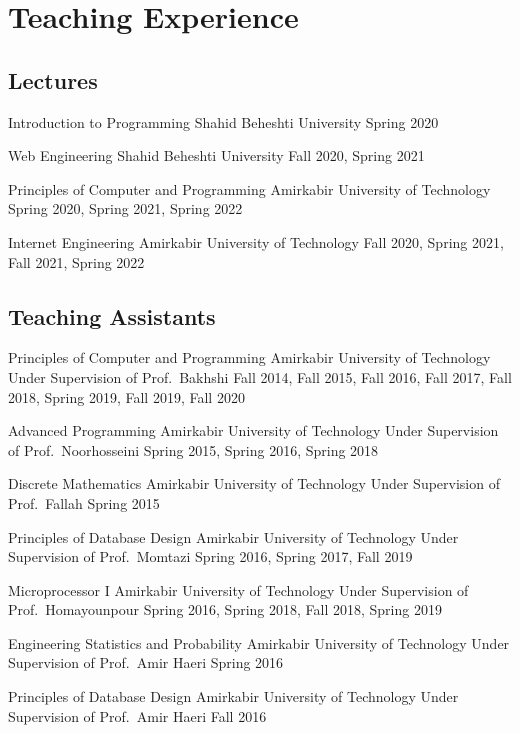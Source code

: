 \section{Teaching Experience}

\subsection{Lectures}
\cventry{}
  {Introduction to Programming}
  {}
  {Shahid Beheshti University}
  {}
  {Spring 2020}

\cventry{}
  {Web Engineering}
  {}
  {Shahid Beheshti University}
  {}
  {Fall 2020, Spring 2021}

\cventry{}
  {Principles of Computer and Programming}
  {}
  {Amirkabir University of Technology}
  {}
  {Spring 2020, Spring 2021, Spring 2022}

\cventry{}
  {Internet Engineering}
  {}
  {Amirkabir University of Technology}
  {}
  {Fall 2020, Spring 2021, Fall 2021, Spring 2022}

\subsection{Teaching Assistants}

\cventry{}
  {Principles of Computer and Programming}
  {}
  {Amirkabir University of Technology}
  {Under Supervision of Prof.\ Bakhshi}
  {Fall 2014, Fall 2015, Fall 2016, Fall 2017, Fall 2018, Spring 2019, Fall 2019, Fall 2020}

\cventry{}
  {Advanced Programming}
  {}
  {Amirkabir University of Technology}
  {Under Supervision of Prof.\ Noorhosseini}
  {Spring 2015, Spring 2016, Spring 2018}

\cventry{}
  {Discrete Mathematics}
  {}
  {Amirkabir University of Technology}
  {Under Supervision of Prof.\ Fallah}
  {Spring 2015}

\cventry{}
  {Principles of Database Design}
  {}
  {Amirkabir University of Technology}
  {Under Supervision of Prof.\ Momtazi}
  {Spring 2016, Spring 2017, Fall 2019}

\cventry{}
  {Microprocessor I}
  {}
  {Amirkabir University of Technology}
  {Under Supervision of Prof.\ Homayounpour}
  {Spring 2016, Spring 2018, Fall 2018, Spring 2019}

\cventry{}
  {Engineering Statistics and Probability}
  {}
  {Amirkabir University of Technology}
  {Under Supervision of Prof.\ Amir Haeri}
  {Spring 2016}

\cventry{}
  {Principles of Database Design}
  {}
  {Amirkabir University of Technology}
  {Under Supervision of Prof.\ Amir Haeri}
  {Fall 2016}

